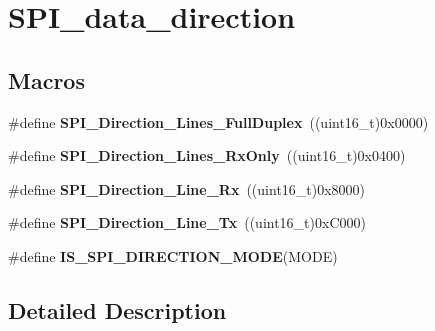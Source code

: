 \hypertarget{group___s_p_i__data__direction}{\section{S\-P\-I\-\_\-data\-\_\-direction}
\label{group___s_p_i__data__direction}
}
\subsection*{Macros}
\begin{DoxyCompactItemize}
\item 
\hypertarget{group___s_p_i__data__direction_gab6bdb82e315a90210c4425c46bbdf5f1}{\#define {\bfseries S\-P\-I\-\_\-\-Direction\-\_\-Lines\-\_\-\-Full\-Duplex}~((uint16\-\_\-t)0x0000)}\label{group___s_p_i__data__direction_gab6bdb82e315a90210c4425c46bbdf5f1}

\item 
\hypertarget{group___s_p_i__data__direction_gab8ab942f7240394f50e4c86c5288516a}{\#define {\bfseries S\-P\-I\-\_\-\-Direction\-\_\-Lines\-\_\-\-Rx\-Only}~((uint16\-\_\-t)0x0400)}\label{group___s_p_i__data__direction_gab8ab942f7240394f50e4c86c5288516a}

\item 
\hypertarget{group___s_p_i__data__direction_ga42ea8306cfc1f23ffc51efae6f66320e}{\#define {\bfseries S\-P\-I\-\_\-\-Direction\-\_\-Line\-\_\-\-Rx}~((uint16\-\_\-t)0x8000)}\label{group___s_p_i__data__direction_ga42ea8306cfc1f23ffc51efae6f66320e}

\item 
\hypertarget{group___s_p_i__data__direction_ga70cc710a771065b2ed11c2ac9697defe}{\#define {\bfseries S\-P\-I\-\_\-\-Direction\-\_\-Line\-\_\-\-Tx}~((uint16\-\_\-t)0x\-C000)}\label{group___s_p_i__data__direction_ga70cc710a771065b2ed11c2ac9697defe}

\item 
\#define {\bfseries I\-S\-\_\-\-S\-P\-I\-\_\-\-D\-I\-R\-E\-C\-T\-I\-O\-N\-\_\-\-M\-O\-D\-E}(M\-O\-D\-E)
\end{DoxyCompactItemize}


\subsection{Detailed Description}


